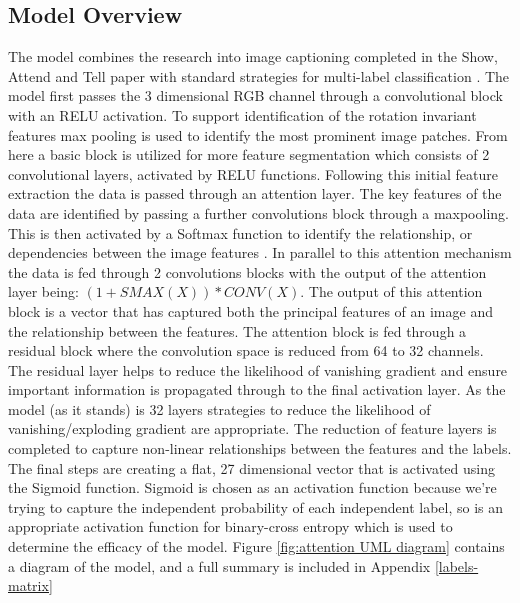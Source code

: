 \documentclass{article}
\begin{document}
\subsection{Model Overview}
The model combines the research into image captioning completed in the Show, Attend and Tell paper with standard strategies for multi-label classification \cite{xu2016show}. The model first passes the 3 dimensional RGB channel through a convolutional block with an RELU activation. To support identification of the rotation invariant features max pooling is used to identify the most prominent image patches. From here a basic block is utilized for more feature segmentation which consists of 2 convolutional layers, activated by RELU functions. 
\newline
\newline
Following this initial feature extraction the data is passed through an attention layer. The key features of the data are identified by passing a further convolutions block through a maxpooling. This is then activated by a Softmax function to identify the relationship, or dependencies between the image features \cite{wang2017residual}. In parallel to this attention mechanism the data is fed through 2 convolutions blocks with the output of the attention layer being: $(1 + SMAX(X))*CONV(X)$. The output of this attention block is a vector that has captured both the principal features of an image and the relationship between the features. 
\newline
\newline
The attention block is fed through a residual block where the convolution space is reduced from 64 to 32 channels. The residual layer helps to reduce the likelihood of vanishing gradient and ensure important information is propagated through to the final activation layer. As the model (as it stands) is 32 layers strategies to reduce the likelihood of vanishing/exploding gradient are appropriate. The reduction of feature layers is completed to capture non-linear relationships between the features and the labels. The final steps are creating a flat, 27 dimensional vector that is activated using the Sigmoid function. Sigmoid is chosen as an activation function because we're trying to capture the independent probability of each independent label, so is an appropriate activation function for binary-cross entropy which is used to determine the efficacy of the model.
\newline
\newline
Figure \ref{fig:attention UML diagram} contains a diagram of the model, and a full summary is included in Appendix \ref{labels-matrix}
\newline
\end{document}
